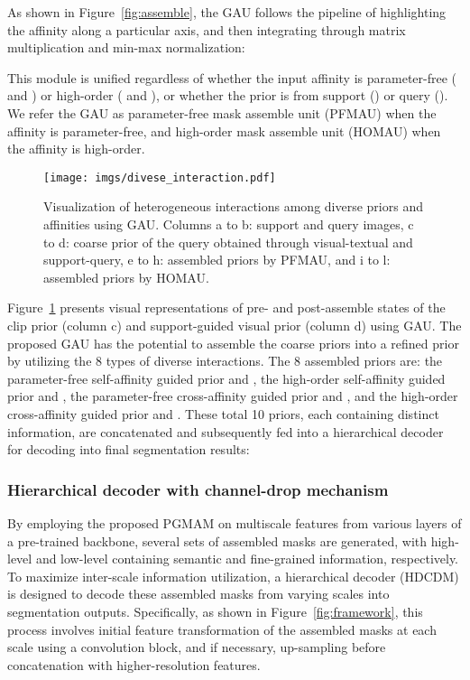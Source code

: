 \documentclass[lettersize,journal]{IEEEtran}
\begin{document}
As shown in Figure~\ref{fig:assemble}, the GAU follows the pipeline of highlighting the affinity along a particular axis, and then integrating through matrix multiplication and min-max normalization:

This module is unified regardless of whether the input affinity is parameter-free ( and ) or high-order ( and ), or whether the prior is from support () or query (). We refer the GAU as parameter-free mask assemble unit (PFMAU) when the affinity is parameter-free, and high-order mask assemble unit (HOMAU) when the affinity is high-order.


\begin{figure}[t]
  \centering
  \texttt{[image: imgs/divese\_interaction.pdf]}
  \caption{Visualization of heterogeneous interactions among diverse priors and affinities using GAU. Columns a to b: support and query images, c to d:  coarse prior of the query obtained through visual-textual and support-query, e to h: assembled priors by PFMAU, and i to l: assembled priors by HOMAU.}

  \label{fig:diverse_interaction}
\end{figure}


Figure~\ref{fig:diverse_interaction} presents visual representations of pre- and post-assemble states of the clip prior  (column c) and support-guided visual prior  (column d) using GAU. The proposed GAU has the potential to assemble the coarse priors into a refined prior by utilizing the 8 types of diverse interactions. The 8 assembled priors are: the parameter-free self-affinity guided prior  and , the high-order self-affinity guided prior  and , the parameter-free cross-affinity guided prior  and , and the high-order cross-affinity guided prior  and . These total 10 priors, each containing distinct information, are concatenated and subsequently fed into a hierarchical decoder for decoding into final segmentation results:



\subsubsection{Hierarchical decoder with channel-drop mechanism}
\label{subsubsection:HDCDM}
By employing the proposed PGMAM on multiscale features from various layers of a pre-trained backbone, several sets of assembled masks  are generated, with high-level and low-level  containing semantic and fine-grained information, respectively. To maximize inter-scale information utilization, a hierarchical decoder (HDCDM) is designed to decode these assembled masks from varying scales into segmentation outputs. Specifically, as shown in Figure~\ref{fig:framework}, this process involves initial feature transformation of the assembled masks at each scale using a convolution block, and if necessary, up-sampling before concatenation with higher-resolution features. 
\end{document}
